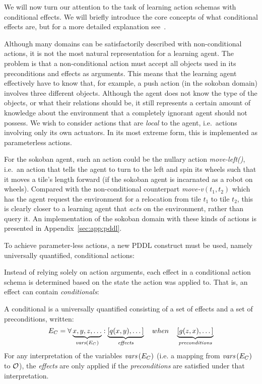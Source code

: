\documentclass[../Master.tex]{subfiles}
\begin{document}
We will now turn our attention to the task of learning action schemas with conditional effects. 
We will briefly introduce the core concepts of what conditional effects are, but for a more detailed explanation see~. 

Although many domains can be satisfactorily described with non-conditional actions, it is not the most natural representation for a learning agent. The problem is that a non-conditional action must accept all objects used in its preconditions and effects as arguments. This means that the learning agent effectively have to know that, for example, a push action (in the sokoban domain) involves three different objects. Although the agent does not know the type of the objects, or what their relations should be, it still represents a certain amount of knowledge about the environment that a completely ignorant agent should not possess. We wish to consider actions that are \emph{local} to the agent, i.e.\ actions involving only its own actuators. In its most extreme form, this is implemented as parameterless actions. 

For the sokoban agent, such an action could be the nullary action \textit{move-left()}, i.e.\ an action that tells the agent to turn to the left and spin its wheels such that it moves a tile's length forward (if the sokoban agent is incarnated as a robot on wheels). Compared with the non-conditional counterpart \textit{move-v}$(t_1, t_2)$ which has the agent request the environment for a relocation from tile $t_1$ to tile $t_2$, this is clearly closer to a learning agent that \textit{acts} on the environment, rather than query it. An implementation of the sokoban domain with these kinds of actions is presented in Appendix~\ref{sec:app:pddl}.

To achieve parameter-less actions, a new PDDL construct must be used, namely universally quantified, conditional actions:

Instead of relying solely on action arguments, each effect in a conditional action schema is determined based on the state the action was applied to. That is, an effect can contain \emph{conditionals}:
\begin{definition}[Conditional]
    A conditional is a universally quantified consisting of a set of effects and a set of preconditions, written:
\begin{equation*}
    E_C = \forall \underbrace{x, y, z, \dots}_{\textit{vars} \left(E_C\right)} : 
    \underbrace{\left[ q(x, y), \dots \right]}_{\textit{effects}} \quad when \quad 
    \underbrace{\left[ g(z, x), \dots  \right]}_{\textit{preconditions}}
\end{equation*}
For any interpretation of the variables $\textit{vars}\left(E_C\right)$ (i.e. a mapping from $\textit{vars}\left(E_C\right)$ to $\mathcal{O}$), the \textit{effects} are only applied if the \textit{preconditions} are satisfied under that interpretation. 
\end{definition}
\end{document}
